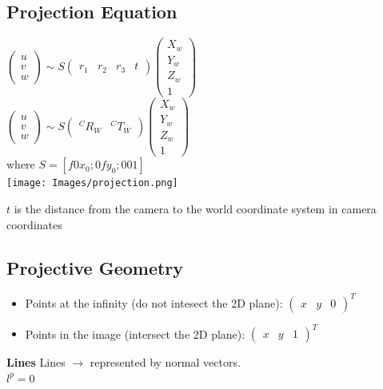 \subsection*{Projection Equation}
$\begin{pmatrix} u\\ v\\ w\end{pmatrix} \sim
S \begin{pmatrix}r_1 & r_2 & r_3 & t \end{pmatrix}
\begin{pmatrix} X_w \\ Y_w \\ Z_w \\ 1\end{pmatrix}$ \\
$\begin{pmatrix} u\\ v\\ w\end{pmatrix} \sim
S \begin{pmatrix} ^C R_W & ^C T_W \end{pmatrix}
\begin{pmatrix} X_w \\ Y_w \\ Z_w \\ 1\end{pmatrix}$ \\
where $S = [f 0 x_0; 0 f y_0; 0 0 1]$\\
\texttt{[image: Images/projection.png]}

\alert{$t$ is the distance from the camera to the world coordinate
system in camera coordinates}

\subsection*{Projective Geometry}
\begin{itemize}
  \item Points at the infinity (do not intesect the 2D plane): $\begin{pmatrix} x & y & 0
    \end{pmatrix}^T$
    \item Points in the image (intersect the 2D plane): $\begin{pmatrix} x & y & 1
    \end{pmatrix}^T$
\end{itemize}

\textbf{Lines}
Lines $\rightarrow$ represented by normal vectors. \\
$l^ p = 0$

